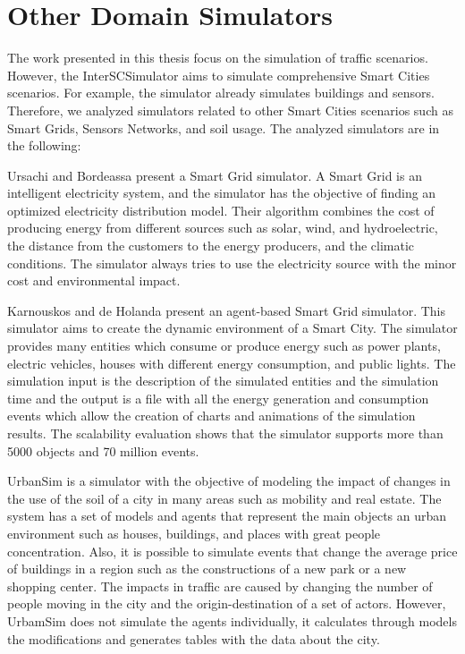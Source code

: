 \section{Other Domain Simulators}
\label{ref:outros_dominios}

The work presented in this thesis focus on the simulation of traffic scenarios. However, the InterSCSimulator aims to simulate comprehensive Smart Cities scenarios. For example, the simulator already simulates buildings and sensors. Therefore, we analyzed simulators related to other Smart Cities scenarios such as Smart Grids, Sensors Networks, and soil usage. The analyzed simulators are in the following:

Ursachi and Bordeassa \cite{ursachi2014smart} present a Smart Grid simulator. A Smart Grid is an intelligent electricity system, and the simulator has the objective of finding an optimized electricity distribution model. Their algorithm combines the cost of producing energy from different sources such as solar, wind, and hydroelectric, the distance from the customers to the energy producers, and the climatic conditions. The simulator always tries to use the electricity source with the minor cost and environmental impact.

Karnouskos and de Holanda \cite{karnouskos2009simulation}  present an agent-based Smart Grid simulator. This simulator aims to create the dynamic environment of a Smart City. The simulator provides many entities which consume or produce energy such as power plants, electric vehicles, houses with different energy consumption, and public lights. The simulation input is the description of the simulated entities and the simulation time and the output is a file with all the energy generation and consumption events which allow the creation of charts and animations of the simulation results. The scalability evaluation shows that the simulator supports more than 5000 objects and 70 million events.

UrbanSim \cite{waddell2003microsimulation} is a simulator with the objective of modeling the impact of changes in the use of the soil of a city in many areas such as mobility and real estate. The system has a set of models and agents that represent the main objects an urban environment such as houses, buildings, and places with great people concentration. Also, it is possible to simulate events that change the average price of buildings in a region such as the constructions of a new park or a new shopping center. The impacts in traffic are caused by changing the number of people moving in the city and the origin-destination of a set of actors. However, UrbamSim does not simulate the agents individually, it calculates through models the modifications and generates tables with the data about the city.

